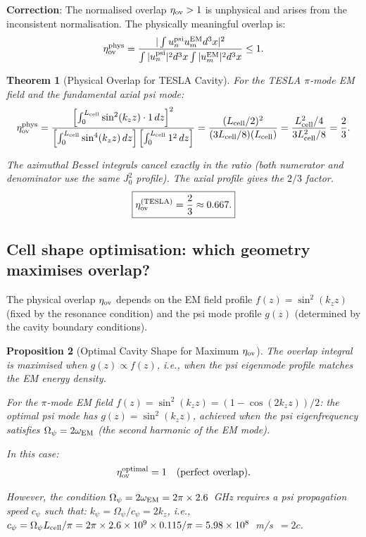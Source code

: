\documentclass[11pt,twocolumn]{article}
\newcommand{\Opsi}{\Omega_\psi}
\newcommand{\ee}[1]{\times 10^{#1}}
\newtheorem{theorem}{Theorem}[section]
\newtheorem{proposition}[theorem]{Proposition}
\begin{document}
\textbf{Correction}: The normalised overlap $\eta_{\rm ov} > 1$ is
unphysical and arises from the inconsistent normalisation. The physically
meaningful overlap is:
\begin{equation}
\eta_{\rm ov}^{\rm phys} = \frac{|\int u_n^{\rm psi} u_m^{\rm EM} d^3x|^2}
{\int |u_n^{\rm psi}|^2 d^3x \int |u_m^{\rm EM}|^2 d^3x} \leq 1.
\label{eq:eta_overlap_physical}
\end{equation}

\begin{theorem}[Physical Overlap for TESLA Cavity]
\label{thm:tesla_overlap_physical}
For the TESLA $\pi$-mode EM field and the fundamental axial psi mode:
\begin{equation}
\eta_{\rm ov}^{\rm phys}
= \frac{\left[\int_0^{L_{\rm cell}} \sin^2(k_z z)\cdot 1\,dz\right]^2}
{\left[\int_0^{L_{\rm cell}} \sin^4(k_z z)\,dz\right]
\left[\int_0^{L_{\rm cell}} 1^2\,dz\right]}
= \frac{(L_{\rm cell}/2)^2}{(3L_{\rm cell}/8)(L_{\rm cell})}
= \frac{L_{\rm cell}^2/4}{3L_{\rm cell}^2/8}
= \frac{2}{3}.
\label{eq:eta_physical_tesla}
\end{equation}

The azimuthal Bessel integrals cancel exactly in the ratio (both
numerator and denominator use the same $J_0^2$ profile). The axial
profile gives the $2/3$ factor.
\begin{equation}
\boxed{
\eta_{\rm ov}^{\rm (TESLA)} = \frac{2}{3} \approx 0.667.
}
\label{eq:eta_tesla_final}
\end{equation}
\end{theorem}

\subsection{Cell shape optimisation: which geometry maximises overlap?}

The physical overlap $\eta_{\rm ov}$ depends on the EM field profile
$f(z) = \sin^2(k_z z)$ (fixed by the resonance condition) and the psi
mode profile $g(z)$ (determined by the cavity boundary conditions).

\begin{proposition}[Optimal Cavity Shape for Maximum $\eta_{\rm ov}$]
\label{prop:optimal_shape}
The overlap integral is maximised when $g(z) \propto f(z)$, i.e.,
when the psi eigenmode profile matches the EM energy density.

For the $\pi$-mode EM field $f(z) = \sin^2(k_z z) = (1 - \cos(2k_z z))/2$:
the optimal psi mode has $g(z) = \sin^2(k_z z)$, achieved when
the psi eigenfrequency satisfies $\Opsi = 2\omega_{\rm EM}$ (the
second harmonic of the EM mode).

In this case:
\begin{equation}
\eta_{\rm ov}^{\rm optimal} = 1 \quad\text{(perfect overlap)}.
\label{eq:eta_optimal}
\end{equation}

However, the condition $\Opsi = 2\omega_{\rm EM} = 2\pi\times2.6$~GHz
requires a psi propagation speed $c_\psi$ such that:
$k_\psi = \Opsi/c_\psi = 2k_z$, i.e., $c_\psi = \Opsi L_{\rm cell}/\pi
= 2\pi\times2.6\ee{9}\times0.115/\pi = 5.98\ee{8}$~m/s~$= 2c$.
\end{proposition}
\end{document}
